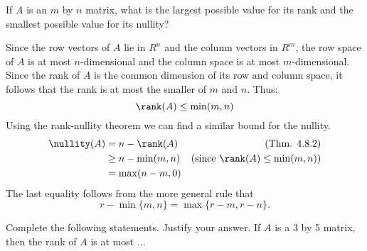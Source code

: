\ii If $A$ is an $m$ by $n$ matrix, what is the largest possible value for its rank and the smallest possible value for its nullity?
\\
\begin{solution}
\noindent Since the row vectors of $A$ lie in $R^n$ and the column vectors in $R^m$, the row space of $A$ is at most $n$-dimensional and the column space is at most $m$-dimensional. Since the rank of $A$ is the common dimension of its row and column space, it follows that the rank is at most the smaller of $m$ and $n$. Thus:
$$
\rank(A)\leq \min(m,n)
$$
Using the rank-nullity theorem we can find a similar bound for the nullity.
\begin{align*}
\nullity(A) &= n - \rank(A) &\text{ (Thm. 4.8.2)}\\
&\geq n - \min(m,n) &\text{(since $\rank(A)\leq\min(m,n)$)}\\
&= \max(n-m,0) &
\end{align*}
The last equality follows from the more general rule that \[ r-\min\{m,n\}=\max\{r-m,r-n\}.\]
\end{solution}
\ii Complete the following statements. Justify your answer. 
\bb
\ii If $A$ is a  3 by 5 matrix, then the rank of $A$ is at most $\dots$

